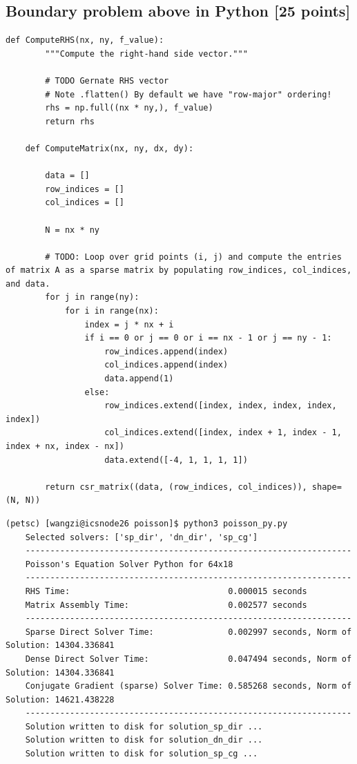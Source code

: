 \documentclass[unicode,11pt,a4paper,oneside,numbers=endperiod,openany]{scrartcl}
\begin{document}
\subsection{Boundary problem above in Python [25 points]}
\begin{lstlisting}[language=MyPython, style=mystyle, caption={Matrix and RHS Computation in Python}]
	def ComputeRHS(nx, ny, f_value):
		"""Compute the right-hand side vector."""
	
		# TODO Gernate RHS vector
		# Note .flatten() By default we have "row-major" ordering!
		rhs = np.full((nx * ny,), f_value)
		return rhs
	
	def ComputeMatrix(nx, ny, dx, dy):
	
		data = []
		row_indices = []
		col_indices = []
	
		N = nx * ny    
	
		# TODO: Loop over grid points (i, j) and compute the entries of matrix A as a sparse matrix by populating row_indices, col_indices, and data.
		for j in range(ny):
			for i in range(nx):
				index = j * nx + i
				if i == 0 or j == 0 or i == nx - 1 or j == ny - 1:
					row_indices.append(index)
					col_indices.append(index)
					data.append(1)
				else:
					row_indices.extend([index, index, index, index, index])
					col_indices.extend([index, index + 1, index - 1, index + nx, index - nx])
					data.extend([-4, 1, 1, 1, 1])
	
		return csr_matrix((data, (row_indices, col_indices)), shape=(N, N))
\end{lstlisting}
\begin{lstlisting}[language=MyBatch, style=mystyle, caption={Poisson Solver Output}]
	(petsc) [wangzi@icsnode26 poisson]$ python3 poisson_py.py 
	Selected solvers: ['sp_dir', 'dn_dir', 'sp_cg']
	------------------------------------------------------------------
	Poisson's Equation Solver Python for 64x18
	------------------------------------------------------------------
	RHS Time:                                0.000015 seconds
	Matrix Assembly Time:                    0.002577 seconds
	------------------------------------------------------------------
	Sparse Direct Solver Time:               0.002997 seconds, Norm of Solution: 14304.336841
	Dense Direct Solver Time:                0.047494 seconds, Norm of Solution: 14304.336841
	Conjugate Gradient (sparse) Solver Time: 0.585268 seconds, Norm of Solution: 14621.438228
	------------------------------------------------------------------
	Solution written to disk for solution_sp_dir ...
	Solution written to disk for solution_dn_dir ...
	Solution written to disk for solution_sp_cg ...
	\end{lstlisting}
\end{document}
